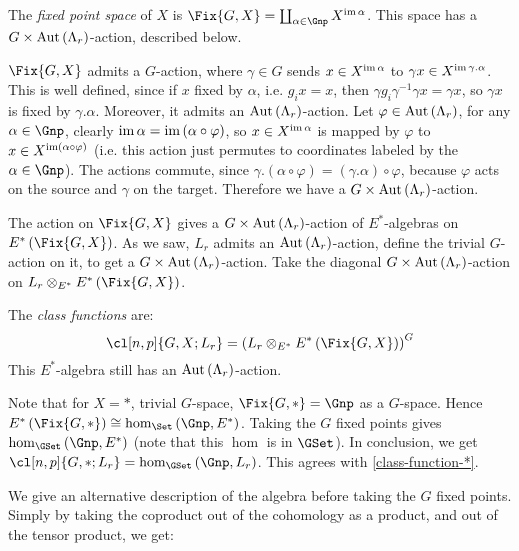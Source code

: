 \begin{definition}
	The \emph{fixed point space} of $X$ is $\Fix{G,X} = \coprod_{\alpha \in \Gnp} X^{\im \alpha}$.
	This space has a $G \times \operatorname{Aut} \left(\Lambda_r\right)$-action, described below.
\end{definition}

$\Fix{G,X}$ admits a $G$-action, where $\gamma \in G$ sends $x \in X^{\operatorname{im} \alpha}$ to $\gamma x \in X^{\operatorname{im} \gamma.\alpha}$.
This is well defined, since if $x$ fixed by $\alpha$, i.e. $g_i x = x$, then $\gamma g_i \gamma^{-1} \gamma x = \gamma x$, so $\gamma x$ is fixed by $\gamma. \alpha$.
Moreover, it admits an $\operatorname{Aut}\left(\Lambda_r\right)$-action.
Let $\varphi \in \operatorname{Aut}\left(\Lambda_r\right)$, for any $\alpha \in \Gnp$, clearly $\operatorname{im} \alpha = \operatorname{im} \left(\alpha\circ\varphi\right)$, so $x \in X^{\operatorname{im} \alpha}$ is mapped by $\varphi$ to $x \in X^{\operatorname{im} \left(\alpha\circ\varphi\right)}$ (i.e. this action just permutes to coordinates labeled by the $\alpha \in \Gnp$).
The actions commute, since $\gamma.\left(\alpha \circ \varphi\right) = \left(\gamma.\alpha\right) \circ \varphi$, because $\varphi$ acts on the source and $\gamma$ on the target.
Therefore we have a $G \times \operatorname{Aut} \left(\Lambda_r\right)$-action.

The action on $\Fix{G,X}$ gives a $G \times \operatorname{Aut} \left(\Lambda_r\right)$-action of $E^*$-algebras on $E^*\left(\Fix{G,X}\right)$.
As we saw, $L_r$ admits an $\operatorname{Aut} \left(\Lambda_r\right)$-action, define the trivial $G$-action on it, to get a $G \times \operatorname{Aut} \left(\Lambda_r\right)$-action.
Take the diagonal $G \times \operatorname{Aut} \left(\Lambda_r\right)$-action on $L_r \otimes_{E^*} E^*\left(\Fix{G,X}\right)$.

\begin{definition}
	The \emph{class functions} are:
	$$
	\cl[n,p]{G,X; L_r}
	= \left(L_r \otimes_{E^*} E^*\left(\Fix{G,X}\right)\right)^G
	$$
	This $E^*$-algebra still has an $\operatorname{Aut} \left(\Lambda_r\right)$-action.
\end{definition}

Note that for $X = *$, trivial $G$-space, $\Fix{G,*} = \Gnp$ as a $G$-space.
Hence $E^*\left(\Fix{G,*}\right) \cong \hom_{\Set}\left(\Gnp, E^*\right)$.
Taking the $G$ fixed points gives $\hom_{\GSet}\left(\Gnp, E^*\right)$ (note that this $\hom$ is in $\GSet$).
In conclusion, we get $\cl[n,p]{G,*; L_r} =  \hom_{\GSet}\left(\Gnp, L_r\right)$.
This agrees with \cref{class-function-*}.

We give an alternative description of the algebra before taking the $G$ fixed points.
Simply by taking the coproduct out of the cohomology as a product, and out of the tensor product, we get:

